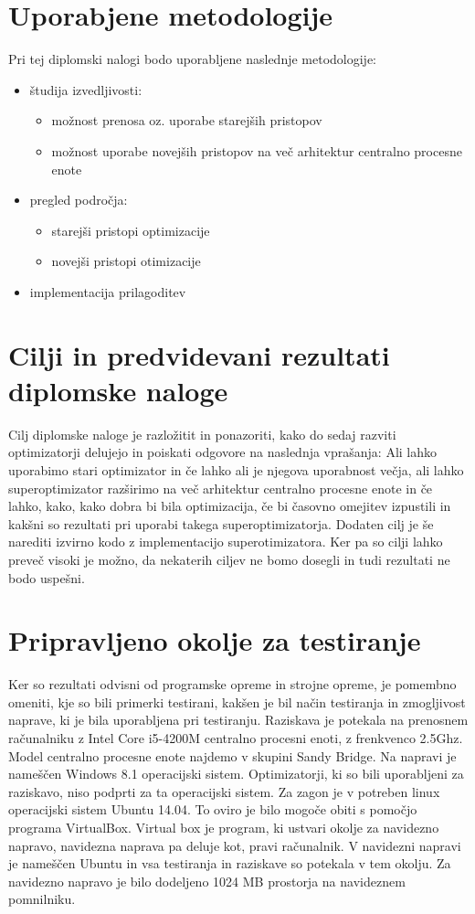 \documentclass[a4paper, 12pt]{book}
\begin{document}
\section{Uporabjene metodologije}
Pri tej diplomski nalogi bodo uporabljene naslednje metodologije:
\begin{itemize}
\item \v{s}tudija izvedljivosti:
\begin{itemize}
	\item mo\v{z}nost prenosa oz. uporabe starej\v{s}ih pristopov
	\item mo\v{z}nost uporabe novej\v{s}ih pristopov na ve\v{c} arhitektur centralno procesne enote
\end{itemize}
\item pregled podro\v cja:
\begin{itemize}
	\item starej\v{s}i pristopi optimizacije
	\item novej\v{s}i pristopi otimizacije
\end{itemize}
\item implementacija prilagoditev
\end{itemize} 
\section{Cilji in predvidevani rezultati diplomske naloge}
Cilj diplomske naloge je razložitit in ponazoriti, kako do sedaj razviti optimizatorji delujejo in poiskati odgovore na naslednja vprašanja: Ali lahko uporabimo stari optimizator in če lahko ali je njegova uporabnost večja, ali lahko superoptimizator razširimo na več arhitektur centralno procesne enote in če lahko, kako, kako dobra bi bila optimizacija, če bi časovno omejitev izpustili in kakšni so rezultati pri uporabi takega superoptimizatorja. Dodaten cilj je še narediti izvirno kodo z implementacijo superotimizatora. Ker pa so cilji lahko preveč visoki je možno, da nekaterih ciljev ne bomo dosegli in tudi rezultati ne bodo uspešni.
\section{Pripravljeno okolje za testiranje}
Ker so rezultati odvisni od programske opreme in strojne opreme, je pomembno omeniti, kje so bili primerki testirani, kakšen je bil način testiranja in zmogljivost naprave, ki je bila uporabljena pri testiranju. Raziskava je potekala na prenosnem računalniku z Intel Core i5-4200M centralno procesni enoti, z frenkvenco 2.5Ghz. Model centralno procesne enote najdemo v skupini Sandy Bridge. Na napravi je nameščen Windows 8.1 operacijski sistem. Optimizatorji, ki so bili uporabljeni za raziskavo, niso podprti za ta operacijski sistem. Za zagon je v potreben linux operacijski sistem Ubuntu 14.04. To oviro je bilo mogoče obiti s pomočjo programa VirtualBox. Virtual box je program, ki ustvari okolje za navidezno napravo, navidezna naprava pa deluje kot, pravi računalnik. V navidezni napravi je nameščen Ubuntu in vsa testiranja in raziskave so potekala v tem okolju. Za navidezno napravo je bilo dodeljeno 1024 MB prostorja na navideznem pomnilniku. 
\end{document}
